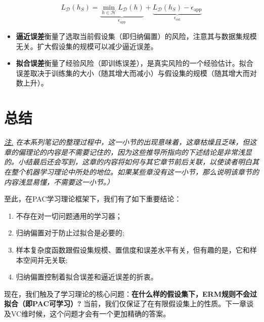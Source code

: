 \documentclass{article}
\begin{document}
	\begin{equation}
	L_\mathcal{D}(h_S) = \underbrace{\min\limits_{h\in\mathcal{H}}L_\mathcal{D}(h)}_{\epsilon_{\mathrm{app}}}
									+ \underbrace{L_\mathcal{D}(h_S)-\epsilon_{\mathrm{app}}}_{\epsilon_{\mathrm{est}}}
	\end{equation}		

	\begin{itemize}
	\item \textbf{逼近误差}衡量了选取当前假设集（即归纳偏置）的风险，注意其与数据集规模无关。扩大假设集的规模可以减少逼近误差。
	\item \textbf{拟合误差}衡量了经验风险（即训练误差），是真实风险的一个经验估计。拟合误差取决于训练集的大小（随其增大而减小）与假设集的规模（随其增大而对数上升）。
	\end{itemize}

\section{总结}

	\vspace{1mm}
	\begin{scriptsize}
	\begin{spacing}{1.2}
	{\sffamily
	\noindent\textit{\underline{注.} 在本系列笔记的整理过程中，这一小节的出现意味着，这章枯燥且乏味，但这章的偏理论的内容是不需要记住的，因为这些推导所指向的下述结论是非常浅显的。小结最后还会写到，这章的内容将如何与其它章节前后关联，以使读者明白其在整个机器学习理论中所处的地位。如果某些章没有这一小节，那么说明该章节的内容浅显易懂，不需要这一小节。）
	}}
	\end{spacing}
	\end{scriptsize}
	\vspace{1mm}

	至此，在PAC学习理论框架下，我们有了如下重要结论：
\begin{enumerate}
\item  不存在对一切问题通用的学习器；
\item  归纳偏置对于防止过拟合是必要的;
\item  样本复杂度函数跟假设集规模、置信度和误差水平有关，但有趣的是，它和样本空间并无关联;
\item  归纳偏置控制着拟合误差和逼近误差的折衷。
\end{enumerate}

	现在，我们触及了学习理论的核心问题：\textbf{在什么样的假设集下，ERM规则不会过拟合（即PAC可学习）?} 当前，我们仅保证了在有限假设集上的性质。下一章谈及VC维时候，这个问题才会有一个更加精确的答案。
\end{document}
